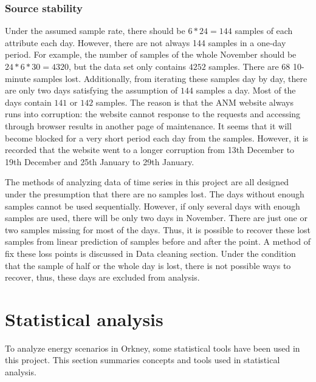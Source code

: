\documentclass[12pt,a4paper]{report}
\begin{document}
                \subsubsection{Source stability}
                \label{text_source_stability}
                Under the assumed sample rate, there should be $6*24=144$ samples of each attribute each day. However, there are not always 144 samples in a one-day period.
                For example, the number of samples of the whole November should be $24*6*30=4320$, but the data set only contains $4252$ samples. There are $68$ 10-minute samples
                lost. Additionally, from iterating these samples day by day, there are only two days satisfying the assumption of $144$ samples a day. Most of the days contain
                $141$ or $142$ samples. The reason is that the ANM website always runs into corruption: the website cannot response to the requests and accessing through browser results
                in another page of maintenance. It seems that it will become blocked for a very short period each day from the samples. However, it is recorded that the website
                went to a longer corruption from 13th December to 19th December and 25th January to 29th January.

                The methods of analyzing data of time series in this project are all designed under the presumption that there are no samples lost. The days without enough samples cannot be
                used sequentially. However, if only several days with enough samples are used, there will be only two days in November. There are just one or two samples missing for most of the days.
                Thus, it is possible to recover these lost samples from linear prediction of samples before and after the point. A method of fix these loss points is discussed
                in Data cleaning section. Under the condition that the sample of half or the whole day is lost, there is not possible ways to recover, thus, these days are excluded from
                analysis.
            
                
        
        \section{Statistical analysis}
        To analyze energy scenarios in Orkney, some statistical tools have been used in this project.
        This section summaries concepts and tools used in statistical analysis.
        
\end{document}
